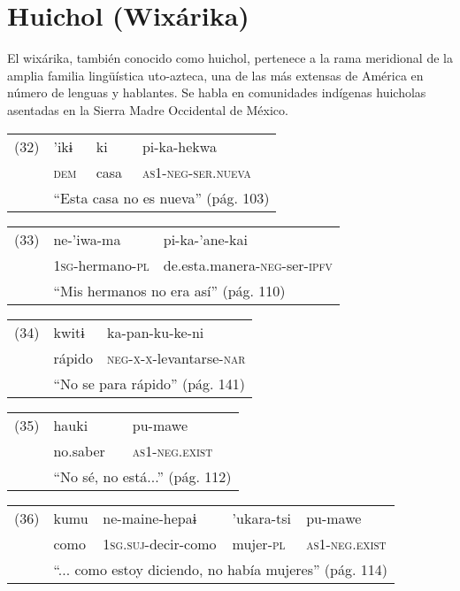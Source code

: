 \section*{Huichol (Wixárika)}

\noindent El wixárika, también conocido como huichol, pertenece a la rama meridional de la amplia familia lingüística uto-azteca, una de las más extensas de América en número de lenguas y hablantes. Se habla en comunidades indígenas huicholas asentadas en la Sierra Madre Occidental de México. \vspace{0.5cm}

{\setmainfont{Doulos SIL} 
\begin{tabular}{llll}
(32) & 'ikɨ & ki & pi-ka-hekwa \\
& \textsc{dem} & casa & \textsc{as1-neg-ser.nueva} \\
& \multicolumn{3}{l}{``Esta casa no es nueva'' (pág. 103)}
\end{tabular} \vspace{0.5cm}

\begin{tabular}{lll}
(33) & ne-'iwa-ma & pi-ka-'ane-kai \\
& \textsc{1sg}-hermano-\textsc{pl} & de.esta.manera-\textsc{neg}-ser-\textsc{ipfv} \\
& \multicolumn{2}{l}{``Mis hermanos no era así'' (pág. 110)}
\end{tabular} \vspace{0.3cm}

\begin{tabular}{lll}
(34) & kwitɨ & ka-pan-ku-ke-ni \\
& rápido & \textsc{neg-x-x}-levantarse-\textsc{nar} \\
& \multicolumn{2}{l}{``No se para rápido'' (pág. 141)}
\end{tabular} \vspace{0.3cm}

\begin{tabular}{lll}
(35) & hauki & pu-mawe \\
& no.saber & \textsc{as1-neg.exist} \\
& \multicolumn{2}{l}{``No sé, no está...'' (pág. 112)}
\end{tabular} \vspace{0.3cm}

\begin{tabular}{lllll}
(36) & kumu & ne-maine-hepaɨ & 'ukara-tsi & pu-mawe \\
& como & \textsc{1sg.suj}-decir-como & mujer-\textsc{pl} & \textsc{as1-neg.exist} \\
& \multicolumn{4}{l}{``... como estoy diciendo, no había mujeres'' (pág. 114)}
\end{tabular} \vspace{0.3cm}
}

